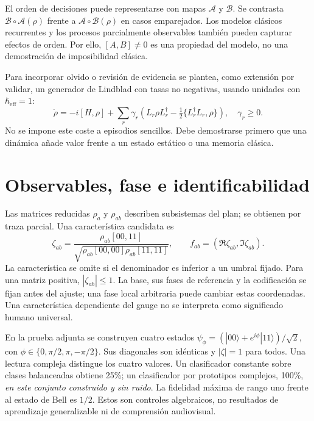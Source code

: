 El orden de decisiones puede representarse con mapas $\mathcal A$ y $\mathcal B$. Se contrasta $\mathcal B\circ\mathcal A(\rho)$ frente a $\mathcal A\circ\mathcal B(\rho)$ en casos emparejados. Los modelos clásicos recurrentes y los procesos parcialmente observables también pueden capturar efectos de orden. Por ello, $[A,B]\neq0$ es una propiedad del modelo, no una demostración de imposibilidad clásica.

Para incorporar olvido o revisión de evidencia se plantea, como extensión por validar, un generador de Lindblad con tasas no negativas, usando unidades con $\hbar_{\mathrm{eff}}=1$:
\begin{equation}
 \dot\rho=-i[H,\rho]+\sum_r\gamma_r\left(L_r\rho L_r^\dagger-\tfrac12\{L_r^\dagger L_r,\rho\}\right),\quad\gamma_r\geq0.
\end{equation}
No se impone este coste a episodios sencillos. Debe demostrarse primero que una dinámica añade valor frente a un estado estático o una memoria clásica.

\section{Observables, fase e identificabilidad}
Las matrices reducidas $\rho_a$ y $\rho_{ab}$ describen subsistemas del plan; se obtienen por traza parcial. Una característica candidata es
\begin{equation}
 \zeta_{ab}=\frac{\rho_{ab}[00,11]}{\sqrt{\rho_{ab}[00,00]\rho_{ab}[11,11]}},\qquad
 f_{ab}=(\Re\zeta_{ab},\Im\zeta_{ab}).
\end{equation}
La característica se omite si el denominador es inferior a un umbral fijado. Para una matriz positiva, $|\zeta_{ab}|\leq1$. La base, sus fases de referencia y la codificación se fijan antes del ajuste; una fase local arbitraria puede cambiar estas coordenadas. Una característica dependiente del gauge no se interpreta como significado humano universal.

En la prueba adjunta se construyen cuatro estados $\psi_\phi=(|00\rangle+e^{i\phi}|11\rangle)/\sqrt2$, con $\phi\in\{0,\pi/2,\pi,-\pi/2\}$. Sus diagonales son idénticas y $|\zeta|=1$ para todos. Una lectura compleja distingue los cuatro valores. Un clasificador constante sobre clases balanceadas obtiene 25\%; un clasificador por prototipos complejos, 100\%, \emph{en este conjunto construido y sin ruido}. La fidelidad máxima de rango uno frente al estado de Bell es $1/2$. Estos son controles algebraicos, no resultados de aprendizaje generalizable ni de comprensión audiovisual.

